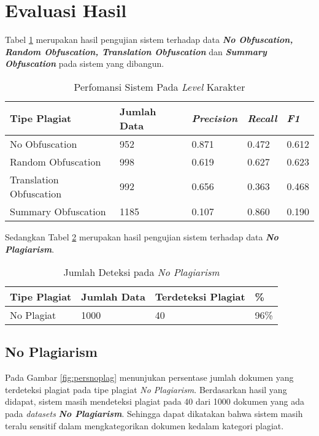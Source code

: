 \documentclass[../Book.tex]{subfiles}
\begin{document}
\section{Evaluasi Hasil}
\noindent Tabel \ref{hasil-runing} merupakan hasil pengujian sistem terhadap data \textit{\textbf{No Obfuscation, Random Obfuscation, Translation Obfuscation}} dan \textit{\textbf{Summary Obfuscation}} pada sistem yang dibangun.
\begin{table}[H]
	\centering
	\caption{Perfomansi Sistem Pada \textit{Level} Karakter}
	\label{hasil-runing}
	\begin{tabular}{@{}lllll@{}}
		\toprule
		Tipe Plagiat            & Jumlah Data & \textit{Precision} & \textit{Recall} & \textit{F1} \\ \midrule
		No Obfuscation          & 952            & 0.871                     & 0.472                 & 0.612             \\
		Random Obfuscation      & 998            & 0.619                    & 0.627                 & 0.623             \\
		Translation Obfuscation & 992            & 0.656                   & 0.363               & 0.468             \\ 
		Summary Obfuscation      & 1185            & 0.107                    & 0.860                 & 0.190             \\\bottomrule
	\end{tabular}
\end{table}

\noindent Sedangkan Tabel \ref{hasil-runing2} merupakan hasil pengujian sistem terhadap data \textit{\textbf{No Plagiarism}}.
\begin{table}[H]
	\centering
	\caption{Jumlah Deteksi pada \textit{No Plagiarism}}
	\label{hasil-runing2}
	\begin{tabular}{@{}llll@{}}
		\toprule
		Tipe Plagiat & Jumlah Data & Terdeteksi Plagiat & \% \\ \midrule
		No Plagiat   & 1000        & 40                 & 96\%      
	\end{tabular}
\end{table}

\subsection{No Plagiarism}

\noindent Pada Gambar \ref{fig:persnoplag} menunjukan persentase jumlah dokumen yang terdeteksi plagiat pada tipe plagiat \textit{No Plagiarism}. Berdasarkan hasil yang didapat, sistem masih mendeteksi plagiat pada 40 dari 1000 dokumen yang ada pada \textit{datasets} \textbf{\textit{No Plagiarism}}. Sehingga dapat dikatakan bahwa sistem masih teralu sensitif dalam mengkategorikan dokumen kedalam kategori plagiat.
\end{document}
